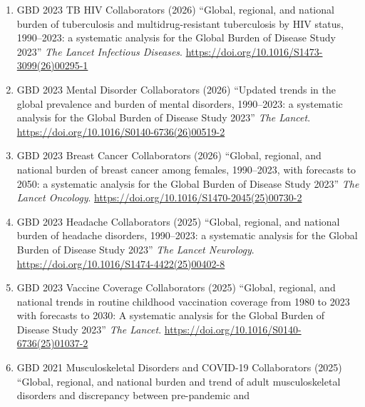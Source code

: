 \documentclass[
  11pt,
  letterpaper,
  DIV=11,
  numbers=noendperiod]{scrartcl}
\providecommand{\tightlist}{%
  \setlength{\itemsep}{0pt}\setlength{\parskip}{0pt}}
\begin{document}
\begin{enumerate}
\def\labelenumi{\arabic{enumi}.}
\tightlist
\item
  GBD 2023 TB HIV Collaborators (2026) ``Global, regional, and national
  burden of tuberculosis and multidrug-resistant tuberculosis by HIV
  status, 1990--2023: a systematic analysis for the Global Burden of
  Disease Study 2023'' \emph{The Lancet Infectious Diseases}.
  \href{https://doi.org/https://doi.org/10.1016/S1473-3099(26)00295-1}{https://doi.org/10.1016/S1473-3099(26)00295-1}\\
\item
  GBD 2023 Mental Disorder Collaborators (2026) ``Updated trends in the
  global prevalence and burden of mental disorders, 1990--2023: a
  systematic analysis for the Global Burden of Disease Study 2023''
  \emph{The Lancet}.
  \href{https://doi.org/https://doi.org/10.1016/S0140-6736(26)00519-2}{https://doi.org/10.1016/S0140-6736(26)00519-2}\\
\item
  GBD 2023 Breast Cancer Collaborators (2026) ``Global, regional, and
  national burden of breast cancer among females, 1990--2023, with
  forecasts to 2050: a systematic analysis for the Global Burden of
  Disease Study 2023'' \emph{The Lancet Oncology}.
  \href{https://doi.org/https://doi.org/10.1016/S1470-2045(25)00730-2}{https://doi.org/10.1016/S1470-2045(25)00730-2}\\
\item
  GBD 2023 Headache Collaborators (2025) ``Global, regional, and
  national burden of headache disorders, 1990--2023: a systematic
  analysis for the Global Burden of Disease Study 2023'' \emph{The
  Lancet Neurology}.
  \href{https://doi.org/https://doi.org/10.1016/S1474-4422(25)00402-8}{https://doi.org/10.1016/S1474-4422(25)00402-8}\\
\item
  GBD 2023 Vaccine Coverage Collaborators (2025) ``Global, regional, and
  national trends in routine childhood vaccination coverage from 1980 to
  2023 with forecasts to 2030: A systematic analysis for the Global
  Burden of Disease Study 2023'' \emph{The Lancet}.
  \href{https://doi.org/https://doi.org/10.1016/S0140-6736(25)01037-2}{https://doi.org/10.1016/S0140-6736(25)01037-2}\\
\item
  GBD 2021 Musculoskeletal Disorders and COVID-19 Collaborators (2025)
  ``Global, regional, and national burden and trend of adult
  musculoskeletal disorders and discrepancy between pre-pandemic and

\end{enumerate}
\end{document}
